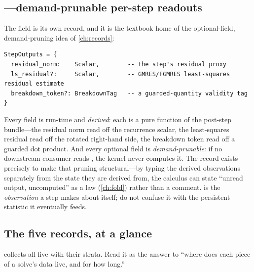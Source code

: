 \subsection{\texorpdfstring{}{StepOutputs}---demand-prunable per-step readouts}

The  field is its own record, and it is the textbook home of the
optional-field, demand-pruning idea of \cref{ch:records}:

\begin{lstlisting}[style=l4style]
StepOutputs = {
  residual_norm:    Scalar,        -- the step's residual proxy
  ls_residual?:     Scalar,        -- GMRES/FGMRES least-squares residual estimate
  breakdown_token?: BreakdownTag   -- a guarded-quantity validity tag
}
\end{lstlisting}

Every field is run-time and \emph{derived}: each is a pure function of the
post-step  bundle---the residual norm read off the recurrence
scalar, the least-squares residual read off the rotated right-hand side, the
breakdown token read off a guarded dot product. And every optional field is
\emph{demand-prunable}: if no downstream consumer reads , the
kernel never computes it. The record exists precisely to make that pruning
structural---by typing the derived observations separately from the 
state they are derived from, the calculus can state ``unread output, uncomputed''
as a law (\cref{ch:fold}) rather than a comment.  is the
\emph{observation} a step makes about itself; do not confuse it with the
persistent  statistic it eventually feeds.

\subsection{The five records, at a glance}

 collects all five with their strata. Read it as the answer
to ``where does each piece of a solve's data live, and for how long.''

